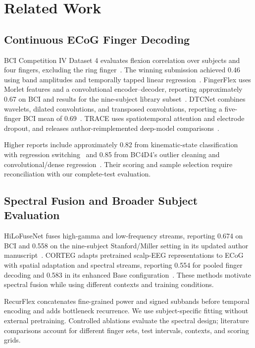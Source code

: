 \section{Related Work}
\subsection{Continuous ECoG Finger Decoding}
BCI Competition IV Dataset 4 evaluates flexion correlation over subjects and four fingers, excluding the ring finger~\cite{competition2008}. The winning submission achieved 0.46 using band amplitudes and temporally tapped linear regression~\cite{competitionresults}. FingerFlex uses Morlet features and a convolutional encoder--decoder, reporting approximately 0.67 on BCI and results for the nine-subject library subset~\cite{fingerflex}. DTCNet combines wavelets, dilated convolutions, and transposed convolutions, reporting a five-finger BCI mean of 0.69~\cite{dtcnet}. TRACE uses spatiotemporal attention and electrode dropout, and releases author-reimplemented deep-model comparisons~\cite{trace2026}.

Higher reports include approximately 0.82 from kinematic-state classification with regression switching~\cite{switching2016} and 0.85 from BC4D4's outlier cleaning and convolutional/dense regression~\cite{bc4d4}. Their scoring and sample selection require reconciliation with our complete-test evaluation.

\subsection{Spectral Fusion and Broader Subject Evaluation}
HiLoFuseNet fuses high-gamma and low-frequency streams, reporting 0.674 on BCI and 0.558 on the nine-subject Stanford/Miller setting in its updated author manuscript~\cite{hilofusenet}. CORTEG adapts pretrained scalp-EEG representations to ECoG with spatial adaptation and spectral streams, reporting 0.554 for pooled finger decoding and 0.583 in its enhanced Base configuration~\cite{corteg}. These methods motivate spectral fusion while using different contexts and training conditions.

RecurFlex concatenates fine-grained power and signed subbands before temporal encoding and adds bottleneck recurrence. We use subject-specific fitting without external pretraining. Controlled ablations evaluate the spectral design; literature comparisons account for different finger sets, test intervals, contexts, and scoring grids.
